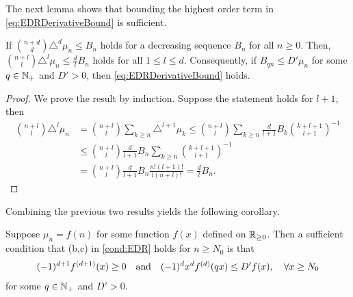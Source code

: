 The next lemma shows that bounding the highest order term in \cref{eq:EDRDerivativeBound} is sufficient.

\begin{lemma}
  If $\binom{n+d}{d} \triangle^d \mu_n \leq B_n$ holds for a decreasing sequence $B_n$ for all $n \geq 0$.
  Then, $\binom{n+l}{l} \triangle^l \mu_n \leq \frac{d}{l} B_n$  holds for all $1 \leq l \leq d$.
  Consequently, if $B_{qn} \leq D' \mu_n$ for some $q \in \mathbb{N}_+$ and $D' >0$, then \cref{eq:EDRDerivativeBound} holds.
\end{lemma}
\begin{proof}
  We prove the result by induction.
  Suppose the statement holds for $l+1$, then
  \begin{align*}
    \binom{n+l}{l} \triangle^l \mu_n
    &=\binom{n+l}{l} \sum_{k \geq n} \triangle^{l+1} \mu_k
    \leq \binom{n+l}{l}\sum_{k \geq n} \frac{d}{l+1} B_k \binom{k+l+1}{l+1}^{-1} \\
    &\leq \binom{n+l}{l} \frac{d}{l+1} B_n \sum_{k \geq n} \binom{k+l+1}{l+1}^{-1} \\
    &=  \binom{n+l}{l} \frac{d}{l+1} B_n \frac{n! (l+1)!}{l(n+l)!}
    = \frac{d}{l} B_n.
  \end{align*}
\end{proof}

Combining the previous two results yields the following corollary.

\begin{corollary}
  \label{cor:EDR_Cond_Derivative}
  Suppose $\mu_n = f(n)$ for some function $f(x)$ defined on $\mathbb{R}_{\geq 0}$.
  Then a sufficient condition that (b,c) in \cref{cond:EDR} holds for $n \geq N_0$ is that
  \begin{align}
    \label{eq:EDR_Cond_Derivative}
    (-1)^{d+1}f^{(d+1)}(x) \geq 0 \qq{and} (-1)^d x^d f^{(d)}(qx) \leq D' f(x),\quad\forall x \geq N_0
  \end{align}
  for some $q \in \mathbb{N}_+$ and $D' > 0$.
\end{corollary}


